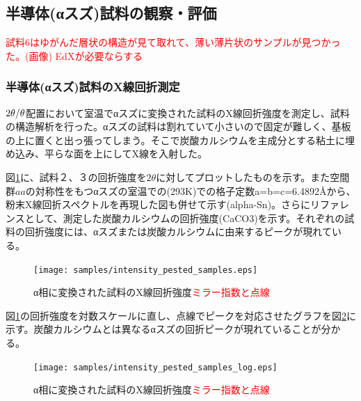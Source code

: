 \subsection{半導体(αスズ)試料の観察・評価}

\textcolor{red}{試料6はゆがんだ層状の構造が見て取れて、薄い薄片状のサンプルが見つかった。(画像)}
\textcolor{red}{EdXが必要ならする}

\subsubsection{半導体(αスズ)試料のX線回折測定}
$\rm 2\theta/\theta$配置において室温でαスズに変換された試料のX線回折強度を測定し、試料の構造解析を行った。αスズの試料は割れていて小さいので固定が難しく、基板の上に置くと出っ張ってしまう。そこで炭酸カルシウムを主成分とする粘土に埋め込み、平らな面を上にしてX線を入射した。

図\ref{fig:intensity_pested_samples}に、試料２、３の回折強度を$2\theta$に対してプロットしたものを示す。また空間群$aa$の対称性をもつαスズの室温での(293K)での格子定数a=b=c=6.4892\AA \cite{THEWLIS}から、粉末X線回折スペクトルを再現した図も併せて示す(alpha-Sn)。さらにリファレンスとして、測定した炭酸カルシウムの回折強度(CaCO3)を示す。それぞれの試料の回折強度には、αスズまたは炭酸カルシウムに由来するピークが現れている。
\begin{figure}[!h]
  \begin{center}
  \texttt{[image: samples/intensity\_pested\_samples.eps]}
  \end{center}
  \caption{α相に変換された試料のX線回折強度\textcolor{red}{ミラー指数と点線}}
  \label{fig:intensity_pested_samples}
\end{figure}

図\ref{fig:intensity_pested_samples}の回折強度を対数スケールに直し、点線でピークを対応させたグラフを図\ref{fig:intensity_pested_samples_log}に示す。炭酸カルシウムとは異なるαスズの回折ピークが現れていることが分かる。%
\begin{figure}[!h]
  \begin{center}
  \texttt{[image: samples/intensity\_pested\_samples\_log.eps]}
  \end{center}
  \caption{α相に変換された試料のX線回折強度\textcolor{red}{ミラー指数と点線}}
  \label{fig:intensity_pested_samples_log}
\end{figure}


